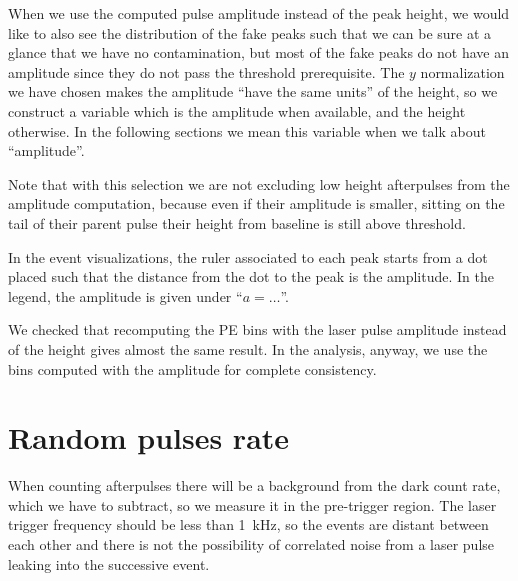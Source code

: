 
When we use the computed pulse amplitude instead of the peak height, we would
like to also see the distribution of the fake peaks such that we can be sure at
a glance that we have no contamination, but most of the fake peaks do not have
an amplitude since they do not pass the threshold prerequisite. The $y$
normalization we have chosen makes the amplitude ``have the same units'' of the
height, so we construct a variable which is the amplitude when available, and
the height otherwise. In the following sections we mean this variable when we
talk about ``amplitude''.

Note that with this selection we are not excluding low height afterpulses from
the amplitude computation, because even if their amplitude is smaller, sitting
on the tail of their parent pulse their height from baseline is still above
threshold.


In the event visualizations, the ruler associated to each peak starts from a
dot placed such that the distance from the dot to the peak is the amplitude.
In the legend, the amplitude is given under ``$a = \ldots$''.

We checked that recomputing the PE bins with the laser pulse amplitude instead
of the height gives almost the same result. In the analysis, anyway, we use the
bins computed with the amplitude for complete consistency.

\section{Random pulses rate}
\label{sec:random}

When counting afterpulses there will be a background from the dark count rate,
which we have to subtract, so we measure it in the pre-trigger region. The
laser trigger frequency should be less than \SI{1}{kHz}, so the events are
distant between each other and there is not the possibility of correlated noise
from a laser pulse leaking into the successive event.

